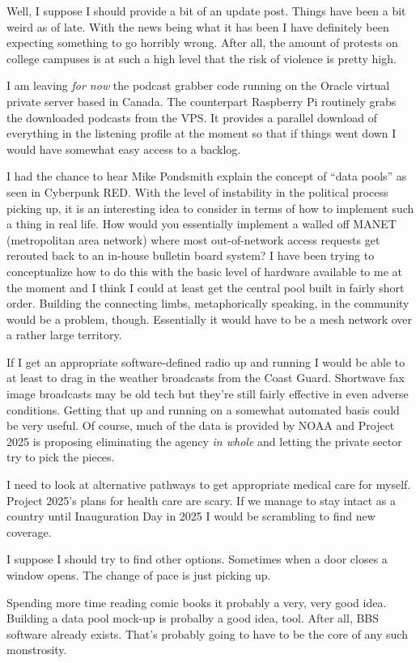 Well, I suppose I should provide a bit of an update post. Things have
been a bit weird as of late. With the news being what it has been I have
definitely been expecting something to go horribly wrong. After all, the
amount of protests on college campuses is at such a high level that the
risk of violence is pretty high.

I am leaving \emph{for now} the podcast grabber code running on the
Oracle virtual private server based in Canada. The counterpart Raspberry
Pi routinely grabs the downloaded podcasts from the VPS. It provides a
parallel download of everything in the listening profile at the moment
so that if things went down I would have somewhat easy access to a
backlog.

I had the chance to hear Mike Pondsmith explain the concept of ``data
pools'' as seen in Cyberpunk RED. With the level of instability in the
political process picking up, it is an interesting idea to consider in
terms of how to implement such a thing in real life. How would you
essentially implement a walled off MANET (metropolitan area network)
where most out-of-network access requests get rerouted back to an
in-house bulletin board system? I have been trying to conceptualize how
to do this with the basic level of hardware available to me at the
moment and I think I could at least get the central pool built in fairly
short order. Building the connecting limbs, metaphorically speaking, in
the community would be a problem, though. Essentially it would have to
be a mesh network over a rather large territory.

If I get an appropriate software-defined radio up and running I would be
able to at least to drag in the weather broadcasts from the Coast Guard.
Shortwave fax image broadcasts may be old tech but they're still fairly
effective in even adverse conditions. Getting that up and running on a
somewhat automated basis could be very useful. Of course, much of the
data is provided by NOAA and Project 2025 is proposing eliminating the
agency \emph{in whole} and letting the private sector try to pick the
pieces.

I need to look at alternative pathways to get appropriate medical care
for myself. Project 2025's plans for health care are scary. If we manage
to stay intact as a country until Inauguration Day in 2025 I would be
scrambling to find new coverage.

I suppose I should try to find other options. Sometimes when a door
closes a window opens. The change of pace is just picking up.

Spending more time reading comic books it probably a very, very good
idea. Building a data pool mock-up is probalby a good idea, tool. After
all, BBS software already exists. That's probably going to have to be
the core of any such monstrosity.

